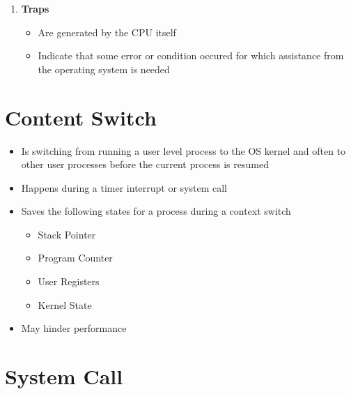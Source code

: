 \documentclass[12pt]{article}
\begin{document}
\begin{itemize}
\begin{enumerate}[1)]
        \bigskip

        \item \textbf{Traps}

        \bigskip

        \begin{itemize}
            \item Are generated by the CPU itself
            \item Indicate that some error or condition occured for which assistance from the operating system is needed
        \end{itemize}

        \bigskip
    \end{enumerate}
\end{itemize}

\section{Content Switch}

\begin{itemize}
    \item Is switching from running a user level process to the OS kernel and often
    to other user processes before the current process is resumed
    \item Happens during a timer interrupt or system call
    \item Saves the following states for a process during a context switch
    \begin{itemize}
        \item Stack Pointer
        \item Program Counter
        \item User Registers
        \item Kernel State
    \end{itemize}
    \item May hinder performance
\end{itemize}

\section{System Call}

\bigskip
\end{document}
